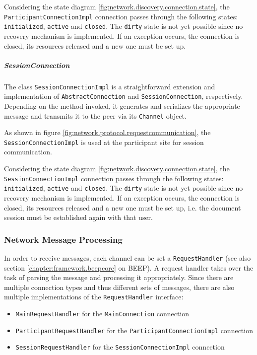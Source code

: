 Considering the state diagram \ref{fig:network.discovery.connection.state}, the \texttt{ParticipantConnectionImpl} connection passes through the following states: \texttt{initialized}, \texttt{active} and \texttt{closed}. The \texttt{dirty} state is not yet possible since no recovery mechanism is implemented. If an exception occurs, the connection is closed, its resources released and a new one must be set up.

\subparagraph{SessionConnection}
The class \texttt{SessionConnectionImpl} is a straightforward extension and implementation of \texttt{AbstractConnection} and \texttt{SessionConnection}, respectively. Depending on the method invoked, it generates and serializes the appropriate message and transmits it to the peer via its \texttt{Channel} object.

As shown in figure \ref{fig:network.protocol.requestcommunication}, the \texttt{SessionConnectionImpl} is used at the participant site for session communication.

Considering the state diagram \ref{fig:network.discovery.connection.state}, the \texttt{SessionConnectionImpl} connection passes through the following states: \texttt{initialized}, \texttt{active} and \texttt{closed}. The \texttt{dirty} state is not yet possible since no recovery mechanism is implemented. If an exception occurs, the connection is closed, its resources released and a new one must be set up, i.e. the document session must be established again with that user.

\subsubsection{Network Message Processing}
In order to receive messages, each channel can be set a \texttt{RequestHandler} (see also section \ref{chapter:framework.beepcore} on BEEP). A request handler takes over the task of parsing the message and processing it appropriately. Since there are multiple connection types and thus different sets of messages, there are also multiple implementations of the \texttt{RequestHandler} interface:

\begin{itemize}
 \item \texttt{MainRequestHandler} for the  \texttt{MainConnection} connection
 \item \texttt{ParticipantRequestHandler} for the \texttt{ParticipantConnectionImpl} connection
 \item \texttt{SessionRequestHandler} for the \texttt{SessionConnectionImpl} connection
\end{itemize}

